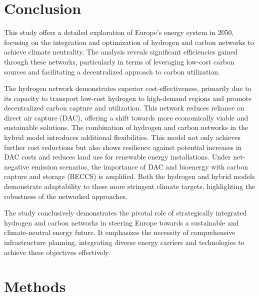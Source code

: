 \documentclass[twocolumn]{article}
\begin{document}
\section{Conclusion}
\label{sec:conclusion}

This study offers a detailed exploration of Europe's energy system in 2050, focusing on the integration and optimization of hydrogen and carbon networks to achieve climate neutrality. The analysis reveals significant efficiencies gained through these networks, particularly in terms of leveraging low-cost carbon sources and facilitating a decentralized approach to carbon utilization.

The hydrogen network demonstrates superior cost-effectiveness, primarily due to its capacity to transport low-cost hydrogen to high-demand regions and promote decentralized carbon capture and utilization. This network reduces reliance on direct air capture (DAC), offering a shift towards more economically viable and sustainable solutions.
The combination of hydrogen and carbon networks in the hybrid model introduces additional flexibilities. This model not only achieves further cost reductions but also shows resilience against potential increases in DAC costs and reduces land use for renewable energy installations.
Under net-negative emission scenarios, the importance of DAC and bioenergy with carbon capture and storage (BECCS) is amplified. Both the hydrogen and hybrid models demonstrate adaptability to these more stringent climate targets, highlighting the robustness of the networked approaches.


The study conclusively demonstrates the pivotal role of strategically integrated hydrogen and carbon networks in steering Europe towards a sustainable and climate-neutral energy future. It emphasizes the necessity of comprehensive infrastructure planning, integrating diverse energy carriers and technologies to achieve these objectives effectively.


\section*{Methods}
\label{sec:methodology}
\end{document}
